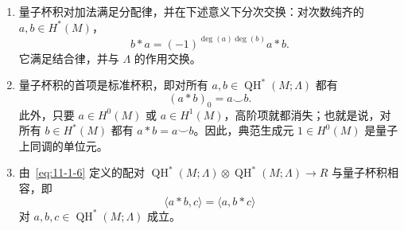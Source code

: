 \begin{proposition}\label{prop:11-1-11}
\begin{enumerate}[label=\textnormal{(\roman*)}]
\item {}量子杯积对加法满足分配律，并在下述意义下分次交换：对次数纯齐的
$a,b\in H^*(M)$，
\[
  b*a=(-1)^{\deg(a)\deg(b)}a*b.
\]
它满足结合律，并与 $\Lambda$ 的作用交换。

\item {}量子杯积的首项是标准杯积，即对所有
$a,b\in\operatorname{QH}^*(M;\Lambda)$ 都有
\[
  (a*b)_0=a\smile b.
\]
此外，只要 $a\in H^0(M)$ 或 $a\in H^1(M)$，高阶项就都消失；也就是说，对所有
$b\in H^*(M)$ 都有 $a*b=a\smile b$。因此，典范生成元
$1\in H^0(M)$ 是量子上同调的单位元。

\item 由~\eqref{eq:11-1-6} 定义的配对
$\operatorname{QH}^*(M;\Lambda)\otimes\operatorname{QH}^*(M;\Lambda)\to R$
与量子杯积相容，即
\[
  \langle a*b,c\rangle=\langle a,b*c\rangle
\]
对 $a,b,c\in\operatorname{QH}^*(M;\Lambda)$ 成立。
\end{enumerate}
\end{proposition}

